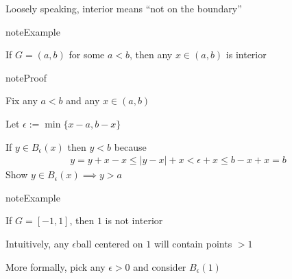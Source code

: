 \documentclass[letterpaper,10pt,english]{jupyterBook}
\begin{document}
\sphinxAtStartPar
Loosely speaking, interior means “not on the boundary”

\begin{figure}[htbp]
\centering

\noindent{}
\end{figure}

\begin{sphinxadmonition}{note}{Example}

\sphinxAtStartPar
If \(G = (a, b)\) for some \(a < b\), then any \(x \in (a, b)\) is interior
\end{sphinxadmonition}

\begin{figure}[htbp]
\centering

\noindent{}
\end{figure}

\begin{sphinxadmonition}{note}{Proof}

\sphinxAtStartPar
Fix any \(a < b\) and any \(x \in (a, b)\)

\sphinxAtStartPar
Let \(\epsilon := \min\{x - a, b - x\}\)

\sphinxAtStartPar
If \(y \in B_\epsilon(x)\) then \(y < b\) because
\begin{equation*}
\begin{split}
y 
= y + x - x
\leq |y - x| + x
< \epsilon + x 
\leq b - x + x = b
\end{split}
\end{equation*}
\sphinxAtStartPar
{} Show \(y \in B_\epsilon(x) \implies y > a\)
\end{sphinxadmonition}

\begin{sphinxadmonition}{note}{Example}

\sphinxAtStartPar
If \(G = [-1, 1]\), then \(1\) is not interior
\end{sphinxadmonition}

\begin{figure}[htbp]
\centering

\noindent{}
\end{figure}

\sphinxAtStartPar
Intuitively, any \(\epsilon\)\sphinxhyphen{}ball centered on \(1\) will contain points \(> 1\)

\sphinxAtStartPar
More formally, pick any \(\epsilon  > 0\) and consider \(B_\epsilon(1)\)
\end{document}
